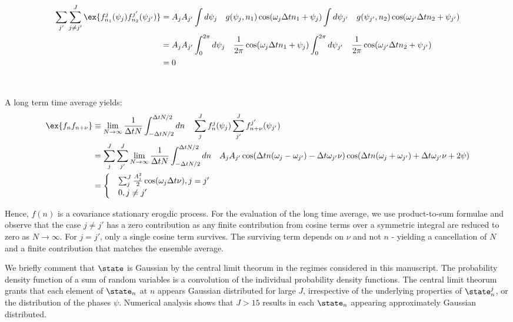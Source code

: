 \begin{align}
\sum_{j'}\sum_{j\neq j'}^J \ex{f^j_{n_1}(\psi_j) f^{j'}_{n_2}(\psi_{j'})} & = A_j A_{j'} \int d \psi_j \quad g(\psi_j, n_1) \cos(\omega_j \Delta t n_1 + \psi_j) \int d \psi_{j'} \quad g(\psi_{j'}, n_2) \cos(\omega_{j'} \Delta t n_2 + \psi_{j'}) \\
& = A_j A_{j'} \int_0^{2\pi} d \psi_j \quad \frac{1}{2\pi} \cos(\omega_j \Delta t n_1 + \psi_j) \int_0^{2\pi} d \psi_{j'} \quad \frac{1}{2\pi}  \cos(\omega_{j'} \Delta t n_2 + \psi_{j'}) \\
& = 0 
\end{align}
 \\
 \\
  A long term time average yields:
\begin{align}
\ex{f_n f_{n+\nu}} & \equiv \lim_{N \to \infty} \frac{1}{\Delta t N} \int_{-\Delta t N/2}^{\Delta t N/2} dn \quad  \sum_j^J f^j_n(\psi_j) \sum_{j'}^{J} f^{j'}_{n + \nu}(\psi_{j'}) \\
&= \sum_j^J  \sum_{j'}^{J} \lim_{N \to \infty} \frac{1}{\Delta t N} \int_{-\Delta t N/2}^{\Delta t N/2} dn \quad   A_j A_{j'} \cos (\Delta t n(\omega_j - \omega_{j'}) - \Delta t \omega_{j'} \nu)  \cos (\Delta t n(\omega_j + \omega_{j'}) + \Delta t \omega_{j'} \nu + 2\psi)\\
&= \begin{cases}
& \sum_j^J \frac{A_j^2}{2} \cos(\omega_j \Delta t \nu),  j = j' \\
& 0, j \neq j'
\end{cases}
\end{align}

Hence, $f(n)$ is a covariance stationary erogdic process. For the evaluation of the long time average, we use product-to-sum formulae and observe that the case $j\neq j'$ has a zero contribution as any finite contribution from cosine terms over a symmetric integral are reduced to zero as $N \rightarrow \infty $.  For $j = j'$, only a single cosine term survives. The surviving term depends on $\nu$ and not $n$ - yielding a cancellation of $N$ and a finite contribution that matches the ensemble average.

We briefly comment that $\state$ is Gaussian by the central limit theorum in the regimes considered in this manuscript. The probability density function of a sum of random variables is a convolution of the individual probability density functions. The central limit theorum grants that each element of $\state_n$ at $n$ appears Gaussian distributed for large $J$, irrespective of the underlying properties of $\state^j_n$, or the distribution of the phases $\psi$. Numerical analysis shows that $J > 15$ results in each $\state_n$ appearing approximately Gaussian distributed. 





